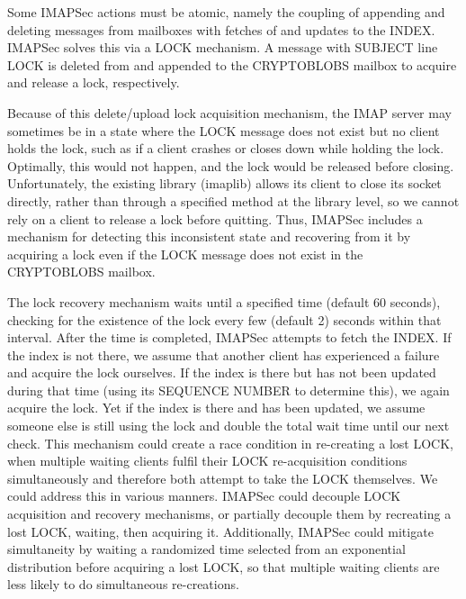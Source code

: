 \documentclass[pageno]{jpaper}
\newcommand{\project}{IMAPSec }
\begin{document}
Some \project actions must be atomic, namely the coupling of appending and deleting messages from mailboxes with fetches of and updates to the INDEX. \project solves this via a LOCK mechanism. A message with SUBJECT line LOCK is deleted from and appended to the CRYPTOBLOBS mailbox to acquire and release a lock, respectively.

Because of this delete/upload lock acquisition mechanism, the IMAP server may sometimes be in a state where the LOCK message does not exist but no client holds the lock, such as if a client crashes or closes down while holding the lock. Optimally, this would not happen, and the lock would be released before closing. Unfortunately, the existing library (imaplib) allows its client to close its socket directly, rather than through a specified method at the library level, so we cannot rely on a client to release a lock before quitting. Thus, \project includes a mechanism for detecting this inconsistent state and recovering from it by acquiring a lock even if the LOCK message does not exist in the CRYPTOBLOBS mailbox.

The lock recovery mechanism waits until a specified time (default 60 seconds), checking for the existence of the lock every few (default 2) seconds within that interval. After the time is completed, \project attempts to fetch the INDEX. If the index is not there, we assume that another client has experienced a failure and acquire the lock ourselves. If the index is there but has not been updated during that time (using its SEQUENCE NUMBER to determine this), we again acquire the lock. Yet if the index is there and has been updated, we assume someone else is still using the lock and double the total wait time until our next check. This mechanism could create a race condition in re-creating a lost LOCK, when multiple waiting clients fulfil their LOCK re-acquisition conditions simultaneously and therefore both attempt to take the LOCK themselves. We could address this in various manners. \project could decouple LOCK acquisition and recovery mechanisms, or partially decouple them by recreating a lost LOCK, waiting, then acquiring it. Additionally, \project could mitigate simultaneity by waiting a randomized time selected from an exponential distribution before acquiring a lost LOCK, so that multiple waiting clients are less likely to do simultaneous re-creations.
\end{document}
